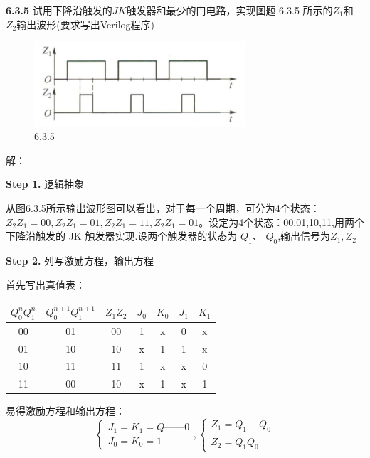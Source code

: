 \documentclass[a4paper,11pt,UTF8]{article}
\begin{document}
\textbf{6.3.5} 试用下降沿触发的$JK$触发器和最少的门电路，实现图题 6.3.5 所示的$Z_{1}$和$Z_{2}$输出波形(要求写出Verilog程序)
\begin{figure}[H]
	\centering
	\includegraphics[width=0.7\textwidth]{6.3.5}
	\caption{6.3.5}
\end{figure}
\noindent 解：

\textbf{Step 1.} 逻辑抽象

从图6.3.5所示输出波形图可以看出，对于每一个周期，可分为4个状态：$Z_2Z_1=00,Z_2Z_1=01,Z_2Z_1=11,Z_2Z_1=01$。设定为4个状态：00,01,10,11,用两个下降沿触发的 JK 触发器实现.设两个触发器的状态为 $Q_{1}$、 $Q_0$,输出信号为$Z_1,Z_2$

\textbf{Step 2.} 列写激励方程，输出方程

首先写出真值表：
\begin{table}[H]
	\centering
	\begin{tabular}{|c|c|c|c|c|c|c|}
		\hline
		$Q_0^nQ_1^n$ & $Q_0^{n+1}Q_1^{n+1}$ & $Z_1Z_2$ & $J_0$ & $K_0$ & $J_1$ & $K_1$\\
		\hline
		00 & 01 & 00 &1&x&0&x\\
		01 & 10 & 10 &x&1&1&x\\
		10 & 11 & 11 &1&x&x&0\\
		11 & 00 & 10 &x&1&x&1\\
		\hline
	\end{tabular}
\end{table}
易得激励方程和输出方程：
$$
\begin{cases}
	J_1=K_1=Q——0\\
	J_0=K_0=1
\end{cases},
\begin{cases}
	Z_1=Q_1+Q_0\\
	Z_2=Q_1\overline{Q}_0
\end{cases}
$$
\end{document}
